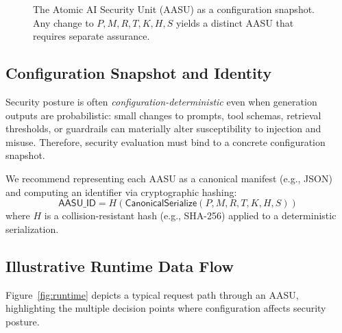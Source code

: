 \documentclass[11pt]{article}
\newcommand{\AASU}{\textsc{AASU}}
\begin{document}
\begin{figure}[t]
  \centering
  \caption{The Atomic AI Security Unit (\AASU{}) as a configuration snapshot. Any change to $P,M,R,T,K,H,S$ yields a distinct \AASU{} that requires separate assurance.}
  \label{fig:aasu}
\end{figure}

\subsection{Configuration Snapshot and Identity}
Security posture is often \emph{configuration-deterministic} even when generation outputs are probabilistic:
small changes to prompts, tool schemas, retrieval thresholds, or guardrails can materially alter susceptibility to injection and misuse.
Therefore, security evaluation must bind to a concrete configuration snapshot.

We recommend representing each \AASU{} as a canonical manifest (e.g., JSON) and computing an identifier via cryptographic hashing:
\begin{equation}
  \textsf{AASU\_ID} = H(\textsf{CanonicalSerialize}(P,M,R,T,K,H,S))
\end{equation}
where $H$ is a collision-resistant hash (e.g., SHA-256) applied to a deterministic serialization.

\subsection{Illustrative Runtime Data Flow}
Figure~\ref{fig:runtime} depicts a typical request path through an \AASU{}, highlighting the multiple decision points where configuration affects security posture.
\end{document}
